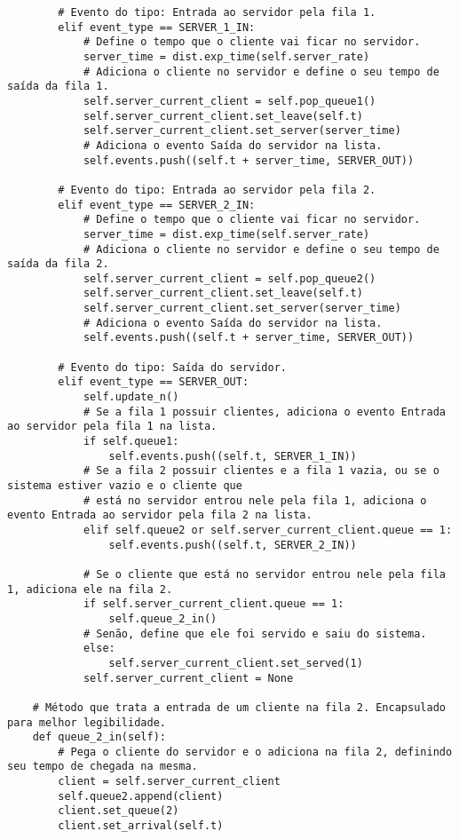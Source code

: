 \begin{verbatim}
        # Evento do tipo: Entrada ao servidor pela fila 1.
        elif event_type == SERVER_1_IN:
            # Define o tempo que o cliente vai ficar no servidor.
            server_time = dist.exp_time(self.server_rate)
            # Adiciona o cliente no servidor e define o seu tempo de saída da fila 1.
            self.server_current_client = self.pop_queue1()
            self.server_current_client.set_leave(self.t)
            self.server_current_client.set_server(server_time)
            # Adiciona o evento Saída do servidor na lista.
            self.events.push((self.t + server_time, SERVER_OUT))        

        # Evento do tipo: Entrada ao servidor pela fila 2.
        elif event_type == SERVER_2_IN:
            # Define o tempo que o cliente vai ficar no servidor.        
            server_time = dist.exp_time(self.server_rate)
            # Adiciona o cliente no servidor e define o seu tempo de saída da fila 2.
            self.server_current_client = self.pop_queue2()
            self.server_current_client.set_leave(self.t)
            self.server_current_client.set_server(server_time)
            # Adiciona o evento Saída do servidor na lista.
            self.events.push((self.t + server_time, SERVER_OUT))                

        # Evento do tipo: Saída do servidor.
        elif event_type == SERVER_OUT:
            self.update_n()
            # Se a fila 1 possuir clientes, adiciona o evento Entrada ao servidor pela fila 1 na lista.
            if self.queue1:
                self.events.push((self.t, SERVER_1_IN))
            # Se a fila 2 possuir clientes e a fila 1 vazia, ou se o sistema estiver vazio e o cliente que
            # está no servidor entrou nele pela fila 1, adiciona o evento Entrada ao servidor pela fila 2 na lista.
            elif self.queue2 or self.server_current_client.queue == 1:
                self.events.push((self.t, SERVER_2_IN))
            
            # Se o cliente que está no servidor entrou nele pela fila 1, adiciona ele na fila 2.
            if self.server_current_client.queue == 1:
                self.queue_2_in()
            # Senão, define que ele foi servido e saiu do sistema.
            else:
                self.server_current_client.set_served(1)
            self.server_current_client = None

    # Método que trata a entrada de um cliente na fila 2. Encapsulado para melhor legibilidade.
    def queue_2_in(self):
        # Pega o cliente do servidor e o adiciona na fila 2, definindo seu tempo de chegada na mesma.
        client = self.server_current_client
        self.queue2.append(client)
        client.set_queue(2)
        client.set_arrival(self.t)


\end{verbatim}
